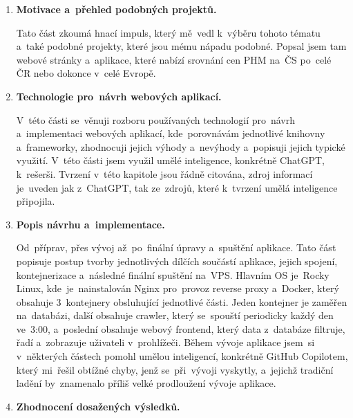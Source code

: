 \begin{enumerate}
    \item \textbf{Motivace a~přehled podobných projektů.}
        
        Tato část zkoumá hnací impuls, který mě~vedl k~výběru tohoto
        tématu a~také podobné projekty, které jsou mému nápadu podobné.
        Popsal jsem tam webové stránky a~aplikace, které nabízí srovnání
        cen PHM na~ČS po~celé ČR nebo dokonce v~celé Evropě.

    \item \textbf{Technologie pro~návrh webových aplikací.}

        V~této části se~věnuji rozboru používaných technologií
        pro~návrh a~implementaci webových aplikací, kde~porovnávám
        jednotlivé knihovny a~frameworky, zhodnocuji jejich
        výhody a~nevýhody a~popisuji jejich typické využití.
        V~této části jsem využil umělé inteligence, konkrétně
        ChatGPT, k~rešerši. Tvrzení v~této kapitole jsou řádně
        citována, zdroj informací je~uveden jak z~ChatGPT, tak
        ze~zdrojů, které k~tvrzení umělá inteligence připojila.

    \item \textbf{Popis návrhu a~implementace.}

        Od~příprav, přes vývoj až~po~finální úpravy a~spuštění aplikace.
        Tato část popisuje postup tvorby jednotlivých dílčích součástí
        aplikace, jejich spojení, kontejnerizace a~následné finální
        spuštění na~VPS. Hlavním OS je~Rocky Linux, kde~je~nainstalován
        Nginx pro~provoz reverse proxy a~Docker, který obsahuje 3~kontejnery
        obsluhující jednotlivé části. Jeden kontejner je zaměřen
        na~databázi, další obsahuje crawler, který se~spouští periodicky
        každý den ve~3:00, a~poslední obsahuje webový frontend, který data
        z~databáze filtruje, řadí a~zobrazuje uživateli v~prohlížeči.
        Během vývoje aplikace jsem~si v~některých částech pomohl umělou
        inteligencí, konkrétně GitHub Copilotem, který mi~řešil obtížné
        chyby, jenž se~při~vývoji vyskytly, a~jejichž tradiční ladění
        by~znamenalo příliš velké prodloužení vývoje aplikace.

    \item \textbf{Zhodnocení dosažených výsledků.}


\end{enumerate}
